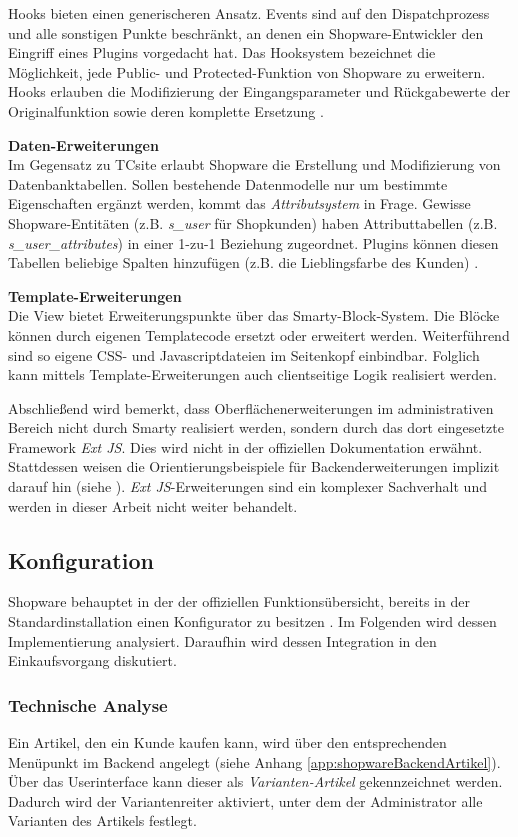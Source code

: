 \documentclass[11pt, a4paper, titlepage, listof=totoc, bibliography=totoc, index=totoc, twoside, openright, headings=normal, draft]{scrreprt}
\begin{document}
Hooks bieten einen generischeren Ansatz. Events sind auf den Dispatchprozess und alle sonstigen Punkte beschränkt, an denen ein Shopware-Entwickler den Eingriff eines Plugins vorgedacht hat. Das Hooksystem bezeichnet die Möglichkeit, jede Public- und Protected-Funktion von Shopware zu erweitern. Hooks erlauben die Modifizierung der Eingangsparameter und Rückgabewerte der Originalfunktion sowie deren komplette Ersetzung \citep{noegel15Hooks}.

\textbf{Daten-Erweiterungen}\\
Im Gegensatz zu TCsite erlaubt Shopware die Erstellung und Modifizierung von Datenbanktabellen. Sollen bestehende Datenmodelle nur um bestimmte Eigenschaften ergänzt werden, kommt das \emph{Attributsystem} in Frage. Gewisse Shopware-Entitäten (z.B. \emph{s\_user} für Shopkunden) haben Attributtabellen (z.B. \emph{s\_user\_attributes}) in einer 1-zu-1 Beziehung zugeordnet. Plugins können diesen Tabellen beliebige Spalten hinzufügen (z.B. die Lieblingsfarbe des Kunden) \citep{shopware5Docs}.

\textbf{Template-Erweiterungen}\\
Die View bietet Erweiterungspunkte über das Smarty-Block-System. Die Blöcke können durch eigenen Templatecode ersetzt oder erweitert werden. Weiterführend sind so eigene CSS- und Javascriptdateien im Seitenkopf einbindbar. Folglich kann mittels Template-Erweiterungen auch clientseitige Logik realisiert werden.

Abschließend wird bemerkt, dass Oberflächenerweiterungen im administrativen Bereich nicht durch Smarty realisiert werden, sondern durch das dort eingesetzte Framework \emph{Ext JS}. Dies wird nicht in der offiziellen Dokumentation erwähnt. Stattdessen weisen die Orientierungsbeispiele für Backenderweiterungen implizit darauf hin (siehe \citet{shopwareBackendPluginExamples}). \emph{Ext JS}-Erweiterungen sind ein komplexer Sachverhalt und werden in dieser Arbeit nicht weiter behandelt.

\subsection{Konfiguration}
\label{shopwareKonfiguration}
Shopware behauptet in der der offiziellen Funktionsübersicht, bereits in der Standardinstallation einen Konfigurator zu besitzen \citep{shopware5Funktionsuebersicht}. Im Folgenden wird dessen Implementierung analysiert. Daraufhin wird dessen Integration in den Einkaufsvorgang diskutiert.

\subsubsection{Technische Analyse}
\label{shopwareKonfigurationAnalyse}
Ein Artikel, den ein Kunde kaufen kann, wird über den entsprechenden Menüpunkt im Backend angelegt (siehe Anhang \ref{app:shopwareBackendArtikel}). Über das Userinterface kann dieser als \emph{Varianten-Artikel} gekennzeichnet werden. Dadurch wird der Variantenreiter aktiviert, unter dem der Administrator alle Varianten des Artikels festlegt.
\end{document}
